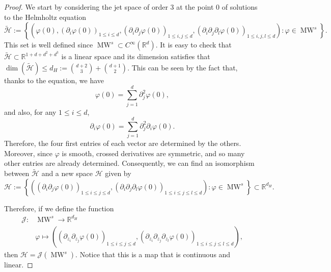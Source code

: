 \documentclass{amsart}
\theoremstyle{definition}
\theoremstyle{remark}
\renewcommand\leq\leqslant
\numberwithin{equation}{section}
\theoremstyle{definition}
\theoremstyle{remark}
\DeclareMathOperator\MW{MW}
\begin{document}
\begin{proof}
	We start by considering the jet space of order $3$ at the point $0$ of solutions to the Helmholtz equation \begin{equation}
		\widetilde{\mathcal{H}}:=\left\{\left(\varphi(0), \left(\partial_i\varphi(0)\right)_{1\leq i\leq d},\left(\partial_{i}\partial_{j}\varphi(0)\right)_{1\leq i,j\leq d},\left(\partial_{i}\partial_{j}\partial_{l}\varphi(0)\right)_{1\leq i, j, l\leq d}\right): \varphi\in \MW^s\right\}.
	\end{equation}This set is well defined since $\MW^s\subset C^\infty\left(\mathbb{R}^d\right)$. It is easy to check that $\widetilde{\mathcal{H}}\subset\mathbb{R}^{1+d+d^2+d^3}$ is a linear space and its dimension satisfies that $\dim\left(\widetilde{\mathcal{H}}\right)\leq d_H:=\binom{d+2}{3} +\binom{d+1}{2}$. This can be seen by the fact that, thanks to the equation, we have \begin{equation}
		\varphi(0)=\sum_{j=1}^d\partial_{j}^2\varphi(0),
	\end{equation} and also, for any $1\leq i\leq d$,\begin{equation}
		\partial_{i}\varphi(0)=\sum_{j=1}^d\partial_{j}^2\partial_{i}\varphi(0).
	\end{equation}Therefore, the four first entries of each vector are determined by the others. Moreover, since $\varphi$ is smooth, crossed derivatives are symmetric, and so many other entries are already determined. Consequently, we can find an isomorphism between $\widetilde{\mathcal{H}}$ and a new space $\mathcal{H}$ given by\begin{equation}
		\mathcal{H}:=\left\{\left(\left(\partial_{i}\partial_{j}\varphi(0)\right)_{1\leq i\leq j\leq d},\left(\partial_{i}\partial_{j}\partial_{l}\varphi(0)\right)_{1\leq i\leq j\leq l\leq d}\right): \varphi\in \MW^s\right\}\subset\mathbb{R}^{d_H}.
	\end{equation}
	
	Therefore, if we define the function \begin{equation}
		\begin{aligned}
			\mathcal{J}:&\MW^s\longrightarrow \mathbb{R}^{d_H}\\&\varphi\mapsto\left(\left(\partial_{z_i}\partial_{z_j}\varphi(0)\right)_{1\leq i\leq j\leq d},\left(\partial_{z_i}\partial_{z_j}\partial_{z_l}\varphi(0)\right)_{1\leq i\leq j\leq l\leq d}\right),
		\end{aligned}
	\end{equation}then $\mathcal{H}=\mathcal{J}\left(\MW^s\right)$. Notice that this is a map  that is continuous and linear. 
	

\end{proof}
\end{document}
